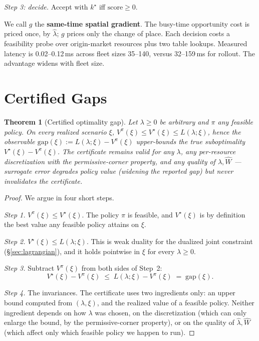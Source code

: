 \documentclass[11pt]{article}
\newtheorem{theorem}{Theorem}
\newcommand{\Vstar}{V^{\star}}
\begin{document}
\emph{Step 3: decide.} Accept with $k^{\star}$ iff
$\mathrm{score} \geq 0$.

We call $g$ the \textbf{same-time spatial gradient}. The busy-time
opportunity cost is priced once, by $\hat{\lambda}$; $g$ prices only
the change of place. Each decision costs a feasibility probe over
origin-market resources plus two table lookups. Measured latency is
0.02--0.12\,ms across fleet sizes 35--140, versus 32--159\,ms for
rollout. The advantage widens with fleet size.

\section{Certified Gaps}
\label{sec:certs}

\begin{theorem}[Certified optimality gap]
\label{thm:cert}
Let $\lambda \geq 0$ be arbitrary and $\pi$ any feasible policy. On
every realized scenario $\xi$,
$V^{\pi}(\xi) \leq \Vstar(\xi) \leq L(\lambda; \xi)$, hence the
observable $\mathrm{gap}(\xi) := L(\lambda; \xi) - V^{\pi}(\xi)$
upper-bounds the true suboptimality $\Vstar(\xi) - V^{\pi}(\xi)$. The
certificate remains valid for any $\lambda$, any per-resource
discretization with the permissive-corner property, and any quality of
$\hat{\lambda}, \widehat{W}$ --- surrogate error degrades policy value
(widening the reported gap) but never invalidates the certificate.
\end{theorem}

\begin{proof}
We argue in four short steps.

\emph{Step 1.} $V^{\pi}(\xi) \leq \Vstar(\xi)$. The policy $\pi$
is feasible, and $\Vstar(\xi)$ is by definition the best value any
feasible policy attains on $\xi$.

\emph{Step 2.} $\Vstar(\xi) \leq L(\lambda; \xi)$. This is weak
duality for the dualized joint constraint (\S\ref{sec:lagrangian}),
and it holds pointwise in $\xi$ for every $\lambda \geq 0$.

\emph{Step 3.} Subtract $V^{\pi}(\xi)$ from both sides of Step~2:
\[
  \Vstar(\xi) - V^{\pi}(\xi) \;\leq\; L(\lambda; \xi) - V^{\pi}(\xi)
  \;=\; \mathrm{gap}(\xi).
\]

\emph{Step 4.} The invariances. The certificate uses two ingredients
only: an upper bound computed from $(\lambda, \xi)$, and the realized
value of a feasible policy. Neither ingredient depends on how $\lambda$
was chosen, on the discretization (which can only enlarge the bound,
by the permissive-corner property), or on the quality of
$\hat{\lambda}, \widehat{W}$ (which affect only which feasible policy
we happen to run).
\end{proof}
\end{document}
